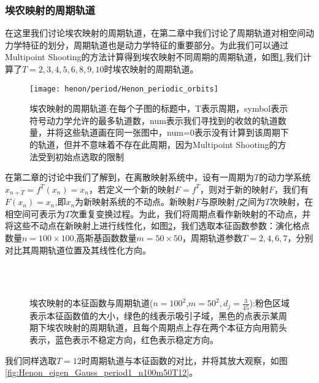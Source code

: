 \subsubsection{埃农映射的周期轨道}
在这里我们讨论埃农映射的周期轨道，在第二章中我们讨论了周期轨道对相空间动力学特征的划分，周期轨道也是动力学特征的重要部分。为此我们可以通过Multipoint Shooting的方法计算得到埃农映射不同周期的周期轨道，如图\ref{fig:Henon_periodic_orbits},我们计算了$T=2,3,4,5,6,8,9,10$时埃农映射的周期轨道。
\begin{figure}
	\centering
	\texttt{[image: henon/period/Henon\_periodic\_orbits]}
    \caption[埃农映射的周期轨道]{埃农映射的周期轨道:在每个子图的标题中，T表示周期，symbol表示符号动力学允许的最多轨道数，num表示我们寻找到的收敛的轨道数量，并将这些轨道画在同一张图中，num=0表示没有计算到该周期下的轨道，但并不意味着不存在此周期，因为Multipoint Shooting的方法受到初始点选取的限制}\label{fig:Henon_periodic_orbits}
\end{figure}
在第二章的讨论中我们了解到，在离散映射系统中，设有一周期为$T$的动力学系统$x_{n+T}=f^T(x_n)=x_n$，若定义一个新的映射$F=f^T$，则对于新的映射$F$，我们有$F(x_n)=x_n$,即$x_n$为新映射系统的不动点。新映射$F$与原映射$f$之间为$T$次映射，在相空间可表示为$T$次重复变换过程。为此，我们将周期点看作新映射的不动点，并将这些不动点在新映射上进行线性化，如图\ref{fig:Henon_eigen_Gauss_period_n100m50T7}，我们选取本征函数参数：演化格点数量$n=100\times 100$,高斯基函数数量$m=50\times 50$，周期轨道参数$T=2,4,6,7$，分别对比其周期轨道位置及其线性化方向。
\begin{figure}
    \centering
    \\
    \\
    \caption[埃农映射的本征函数与周期轨道]{埃农映射的本征函数与周期轨道($n=100^2$,$m=50^2,d_j=\frac{3}{45}$):粉色区域表示本征函数值的大小，绿色的线表示吸引子域，黑色的点表示某周期下埃农映射的周期轨道，且每个周期点上存在两个本征方向用箭头表示，蓝色表示不稳定方向，红色表示稳定方向。}\label{fig:Henon_eigen_Gauss_period_n100m50T7}
\end{figure}
我们同样选取$T=12$时周期轨道与本征函数的对比，并将其放大观察，如图\ref{fig:Henon_eigen_Gauss_period1_n100m50T12}。
